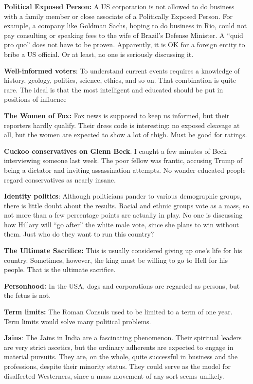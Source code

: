 \textbf{Political Exposed Person:} A US corporation is not allowed to do business with a family member or close associate of a Politically Exposed Person. For example, a company like Goldman Sachs, hoping to do business in Rio, could not pay consulting or speaking fees to the wife of Brazil's Defense Minister. A ``quid pro quo'' does not have to be proven. Apparently, it is OK for a foreign entity to bribe a US official. Or at least, no one is seriously discussing it.

\textbf{Well-informed voters}: To understand current events requires a knowledge of history, geology, politics, science, ethics, and so on. That combination is quite rare. The ideal is that the most intelligent and educated should be put in positions of influence

\textbf{The Women of Fox:} Fox news is supposed to keep us informed, but their reporters hardly qualify. Their dress code is interesting: no exposed cleavage at all, but the women are expected to show a lot of thigh. Must be good for ratings.

\textbf{Cuckoo conservatives on Glenn Beck}. I caught a few minutes of Beck interviewing someone last week. The poor fellow was frantic, accusing Trump of being a dictator and inviting assassination attempts. No wonder educated people regard conservatives as nearly insane.

\textbf{Identity politics}: Although politicians pander to various demographic groups, there is little doubt about the results. Racial and ethnic groups vote as a mass, so not more than a few percentage points are actually in play. No one is discussing how Hillary will ``go after'' the white male vote, since she plans to win without them. Just who do they want to run this country?

\textbf{The Ultimate Sacrifice:} This is usually considered giving up one's life for his country. Sometimes, however, the king must be willing to go to Hell for his people. That is the ultimate sacrifice.

\textbf{Personhood:} In the USA, dogs and corporations are regarded as persons, but the fetus is not.

\textbf{Term limits:} The Roman Consuls used to be limited to a term of one year. Term limits would solve many political problems.

\textbf{Jains}: The Jains in India are a fascinating phenomenon. Their spiritual leaders are very strict ascetics, but the ordinary adherents are expected to engage in material pursuits. They are, on the whole, quite successful in business and the professions, despite their minority status. They could serve as the model for disaffected Westerners, since a mass movement of any sort seems unlikely.

